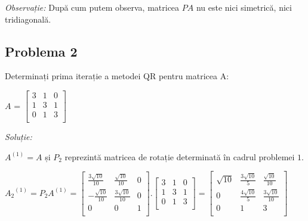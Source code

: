 \documentclass{exam}
\begin{document}
\textit{Observație:} După cum putem observa, matricea $PA$ nu este nici simetrică, nici tridiagonală.



\subsection{Problema 2}
Determinați prima iterație a metodei QR pentru matricea A:
\begin{center}
	$A$ = $\begin{bmatrix}
			3 & 1 & 0 \\
			1 & 3 & 1 \\
			0 & 1 & 3 \\
		\end{bmatrix}$\\
\end{center}

\textit{Soluție:}

$A^{(1)} = A$ și $P_{2}$ reprezintă matricea de rotație determinată în cadrul problemei $1$.

$
	{A_{2}}^{(1)} = P_{2}A^{(1)}  =
	\left[\begin{array}{ccc}
			\frac{3\sqrt{10}}{10} & \frac{\sqrt{10}}{10}  & 0 \\
			-\frac{\sqrt{10}}{10} & \frac{3\sqrt{10}}{10} & 0 \\
			0                     & 0                     & 1 \\
		\end{array}\right] .
	\left[\begin{array}{ccc}
			3 & 1 & 0 \\
			1 & 3 & 1 \\
			0 & 1 & 3 \\
		\end{array}\right] =
	\left[\begin{array}{ccc}
			\sqrt{10} & \frac{3\sqrt{10}}{5} & \frac{\sqrt{10}}{10}  \\
			0         & \frac{4\sqrt{10}}{5} & \frac{3\sqrt{10}}{10} \\
			0         & 1                    & 3                     \\
		\end{array}\right]
$
\end{document}

